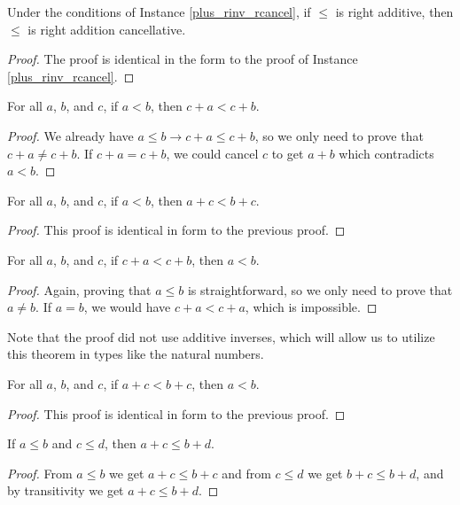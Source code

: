 \documentclass[../../math.tex]{subfiles}
\begin{document}
\begin{instance}
    Under the conditions of Instance \ref{plus_rinv_rcancel}, if $\leq$ is right
    additive, then $\leq$ is right addition cancellative.
\end{instance}
\begin{proof}
    The proof is identical in the form to the proof of Instance
    \ref{plus_rinv_rcancel}.
\end{proof}

\begin{theorem}
    For all $a$, $b$, and $c$, if $a < b$, then $c + a < c + b$.
\end{theorem}
\begin{proof}
    We already have $a \leq b \rightarrow c + a \leq c + b$, so we only need to
    prove that $c + a \neq c + b$.  If $c + a = c + b$, we could cancel $c$ to
    get $a + b$ which contradicts $a < b$.
\end{proof}

\begin{theorem}
    For all $a$, $b$, and $c$, if $a < b$, then $a + c < b + c$.
\end{theorem}
\begin{proof}
    This proof is identical in form to the previous proof.
\end{proof}

\begin{theorem}
    For all $a$, $b$, and $c$, if $c + a < c + b$, then $a < b$.
\end{theorem}
\begin{proof}
    Again, proving that $a \leq b$ is straightforward, so we only need to prove
    that $a \neq b$.  If $a = b$, we would have $c + a < c + a$, which is
    impossible.
\end{proof}
\noindent Note that the proof did not use additive inverses, which will allow us
to utilize this theorem in types like the natural numbers.

\begin{theorem}
    For all $a$, $b$, and $c$, if $a + c < b + c$, then $a < b$.
\end{theorem}
\begin{proof}
    This proof is identical in form to the previous proof.
\end{proof}

\begin{theorem} \label{le_lrplus}
    If $a \leq b$ and $c \leq d$, then $a + c \leq b + d$.
\end{theorem}
\begin{proof}
    From $a \leq b$ we get $a + c \leq b + c$ and from $c \leq d$ we get $b + c
    \leq b + d$, and by transitivity we get $a + c \leq b + d$.
\end{proof}
\end{document}
